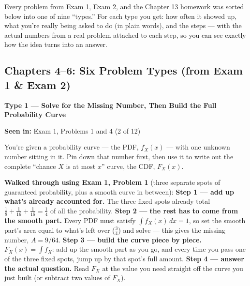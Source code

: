 \documentclass[10pt]{article}
\newcommand{\cheat}[4]{%
  \par\vspace{6pt}\noindent{\color{thmcol}\rule{\linewidth}{1pt}}\par\vspace{2pt}
  \noindent\textbf{\color{thmcol}#1}\par\smallskip\noindent
  #2\par\smallskip
  \noindent{\small\color{excol}\textbf{Example:}} \small #3\par\smallskip
  \noindent{\small\color{notecol}\textbf{Use it when / how:}} \small #4\par
}
\begin{document}
\noindent Every problem from Exam 1, Exam 2, and the Chapter 13 homework was sorted below into
one of nine ``types.'' For each type you get: how often it showed up, what you're really being
asked to do (in plain words), and the steps --- with the actual numbers from a real problem
attached to each step, so you can see exactly how the idea turns into an answer.

\begin{center}
\end{center}

\subsection*{Chapters 4--6: Six Problem Types (from Exam 1 \& Exam 2)}

\cheat{Type 1 --- Solve for the Missing Number, Then Build the Full Probability Curve}{
\textbf{Seen in:} Exam 1, Problems 1 and 4 \quad (2 of 12)
}{
You're given a probability curve --- the PDF, $f_X(x)$ --- with one unknown number sitting in
it. Pin down that number first, then use it to write out the complete ``chance $X$ is at most
$x$'' curve, the CDF, $F_X(x)$.
}{
\textbf{Walked through using Exam 1, Problem 1} (three separate spots of guaranteed
probability, plus a smooth curve in between): \textbf{Step 1 --- add up what's already
accounted for.} The three fixed spots already total $\tfrac18+\tfrac1{16}+\tfrac1{16}=\tfrac14$
of all the probability. \textbf{Step 2 --- the rest has to come from the smooth part.} Every
PDF must satisfy $\int f_X(x)\,dx=1$, so set the smooth part's area equal to what's left over
($\tfrac34$) and solve --- this gives the missing number, $A=9/64$. \textbf{Step 3 --- build
the curve piece by piece.} $F_X(x)=\int f_X$: add up the smooth part as you go, and every time
you pass one of the three fixed spots, jump up by that spot's full amount. \textbf{Step 4 ---
answer the actual question.} Read $F_X$ at the value you need straight off the curve you just
built (or subtract two values of $F_X$).
}
\end{document}
